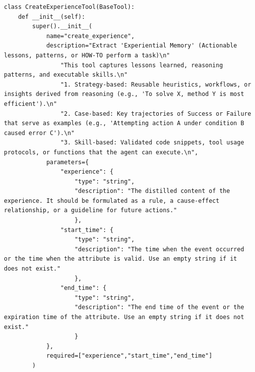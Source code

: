 \documentclass[11pt, a4paper]{lumia}
\begin{document}
\begin{tcolorbox}[title={CreateExperienceTool}, sharp corners, breakable, 
      colframe=Periwinkle, colback=white, 
        boxrule=3pt, boxsep=0.5pt, enhanced, 
        shadow={3pt}{-3pt}{0pt}{opacity=1}]
        \footnotesize
        {\selectfont
\begin{lstlisting}[breaklines=true,showstringspaces=false]
class CreateExperienceTool(BaseTool):
    def __init__(self):
        super().__init__(
            name="create_experience",
            description="Extract 'Experiential Memory' (Actionable lessons, patterns, or HOW-TO perform a task)\n"
                "This tool captures lessons learned, reasoning patterns, and executable skills.\n"
                "1. Strategy-based: Reusable heuristics, workflows, or insights derived from reasoning (e.g., 'To solve X, method Y is most efficient').\n"
                "2. Case-based: Key trajectories of Success or Failure that serve as examples (e.g., 'Attempting action A under condition B caused error C').\n"
                "3. Skill-based: Validated code snippets, tool usage protocols, or functions that the agent can execute.\n",
            parameters={
                "experience": {
                    "type": "string", 
                    "description": "The distilled content of the experience. It should be formulated as a rule, a cause-effect relationship, or a guideline for future actions."
                    },
                "start_time": {
                    "type": "string", 
                    "description": "The time when the event occurred or the time when the attribute is valid. Use an empty string if it does not exist."
                    },
                "end_time": {
                    "type": "string", 
                    "description": "The end time of the event or the expiration time of the attribute. Use an empty string if it does not exist."
                    }
            },
            required=["experience","start_time","end_time"]
        )
\end{lstlisting}
}
\end{tcolorbox}
\end{document}
